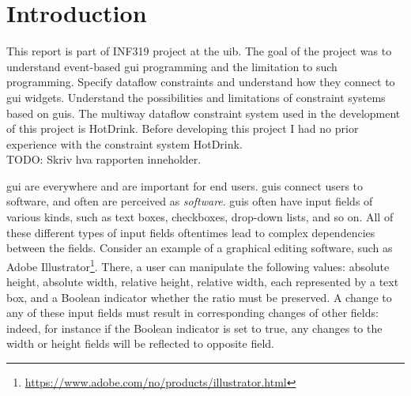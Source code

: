\chapter{Introduction}

This report is part of INF319 project at the \gls{uib}. The goal of the project was to understand event-based \gls{gui} programming and the limitation to such programming. Specify dataflow constraints and understand how they connect to \gls{gui} widgets. Understand the possibilities and limitations of constraint systems based on \gls{gui}s. The multiway dataflow constraint system used in the development of this project is HotDrink. Before developing this project I had no prior experience with the constraint system HotDrink. 
\\TODO: Skriv hva rapporten inneholder.


\gls{gui} are everywhere and are important for end users. \gls{gui}s connect users to software, and often are perceived as \emph{software}. \gls{gui}s often have input fields of various kinds, such as text boxes, checkboxes, drop-down lists, and so on. All of these different types of input fields oftentimes lead to complex dependencies between the fields. Consider an example of a graphical editing software, such as Adobe Illustrator\footnote{\url{https://www.adobe.com/no/products/illustrator.html}}. There, a user can manipulate the following values: absolute height, absolute width, relative height, relative width, each represented by a text box, and a Boolean indicator whether the ratio must be preserved. A change to any of these input fields must result in corresponding changes of other fields: indeed, for instance if the Boolean indicator is set to true, any changes to the width or height fields will be reflected to opposite field.
